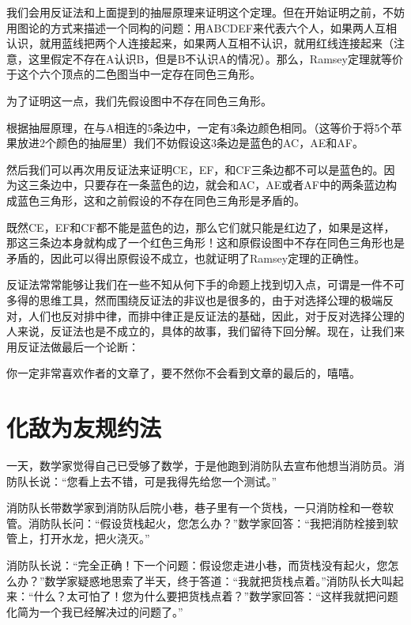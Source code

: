 \documentclass[12pt, letterpaper]{ctexrep}
\newenvironment{shadedquotation}
 {\begin{shaded*}
  \quoting[leftmargin=5pt, rightmargin=5pt, vskip=0pt]
 }
 {\endquoting
 \end{shaded*}
}
\begin{document}
我们会用反证法和上面提到的抽屉原理来证明这个定理。但在开始证明之前，不妨用图论的方式来描述一个同构的问题：用ABCDEF来代表六个人，如果两人互相认识，就用蓝线把两个人连接起来，如果两人互相不认识，就用红线连接起来（注意，这里假定不存在A认识B，但是B不认识A的情况）。那么，Ramsey定理就等价于这个六个顶点的二色图当中一定存在同色三角形。

\begin{center}

\end{center}

为了证明这一点，我们先假设图中不存在同色三角形。

根据抽屉原理，在与A相连的5条边中，一定有3条边颜色相同。（这等价于将5个苹果放进2个颜色的抽屉里）我们不妨假设这3条边是蓝色的AC，AE和AF。

\begin{center}

\end{center}


然后我们可以再次用反证法来证明CE，EF，和CF三条边都不可以是蓝色的。因为这三条边中，只要存在一条蓝色的边，就会和AC，AE或者AF中的两条蓝边构成蓝色三角形，这和之前假设的不存在同色三角形是矛盾的。

既然CE，EF和CF都不能是蓝色的边，那么它们就只能是红边了，如果是这样，那这三条边本身就构成了一个红色三角形！这和原假设图中不存在同色三角形也是矛盾的，因此可以得出原假设不成立，也就证明了Ramsey定理的正确性。

\begin{center}

\end{center}

反证法常常能够让我们在一些不知从何下手的命题上找到切入点，可谓是一件不可多得的思维工具，然而围绕反证法的非议也是很多的，由于对选择公理的极端反对，人们也反对排中律，而排中律正是反证法的基础，因此，对于反对选择公理的人来说，反证法也是不成立的，具体的故事，我们留待下回分解。现在，让我们来用反证法做最后一个论断：

\begin{shadedquotation}
\noindent
你一定非常喜欢作者的文章了，要不然你不会看到文章的最后的，嘻嘻。
\end{shadedquotation}



\section{化敌为友规约法}
\begin{shadedquotation}
\noindent
一天，数学家觉得自己已受够了数学，于是他跑到消防队去宣布他想当消防员。消防队长说：“您看上去不错，可是我得先给您一个测试。”
\noindent

\noindent
消防队长带数学家到消防队后院小巷，巷子里有一个货栈，一只消防栓和一卷软管。消防队长问：“假设货栈起火，您怎么办？”数学家回答：“我把消防栓接到软管上，打开水龙，把火浇灭。”
\noindent

\noindent
消防队长说：“完全正确！下一个问题：假设您走进小巷，而货栈没有起火，您怎么办？”数学家疑惑地思索了半天，终于答道：“我就把货栈点着。”消防队长大叫起来：“什么？太可怕了！您为什么要把货栈点着？”数学家回答：“这样我就把问题化简为一个我已经解决过的问题了。”
\end{shadedquotation}
\end{document}
